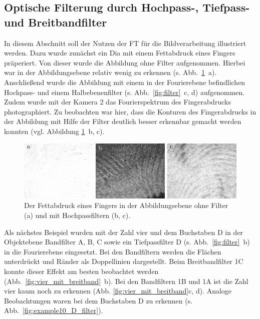 \subsection{Optische Filterung durch Hochpass-, Tiefpass- und Breitbandfilter}

In diesem Abschnitt soll der Nutzen der FT für die Bildverarbeitung illustriert werden. Dazu wurde zunächst ein Dia mit einem Fettabdruck eines Fingers präperiert. Von dieser wurde die Abbildung ohne Filter aufgenommen. Hierbei war in der Abbildungsebene relativ wenig zu erkennen (s. Abb.~\ref{fig:example20_Hochpass}~a). Anschließend wurde die Abbildung mit einem in der Fourierebene befindlichen Hochpass- und einem Halbebenenfilter (s. Abb.~\ref{fig:filter}~c, d) aufgenommen. Zudem wurde mit der Kamera 2 das Fourierspektrum des Fingerabdrucks photographiert. Zu beobachten war hier, dass die Konturen des Fingerabdrucks in der Abbildung mit Hilfe der Filter deutlich besser erkennbar gemacht werden konnten (vgl. Abbildung \ref{fig:example20_Hochpass}~b, c).

\begin{figure}[h]
	\centering
	\includegraphics{images/ergebniss_Fingerab/abb.pdf}
	\caption{
		Der Fettabdruck eines Fingers in der Abbildungsebene ohne Filter (a) und mit Hochpassfiltern (b, c).
	}
	\label{fig:example20_Hochpass}
\end{figure}

Als nächstes Beispiel wurden mit der Zahl vier und dem Buchstaben D in der Objektebene Bandfilter A, B, C  sowie ein Tiefpassfilter D (s. Abb.~\ref{fig:filter}~b) in die Fourierebene eingesetzt. Bei den Bandfiltern werden die Flächen unterdrückt und Ränder als Doppellinien dargestellt. Beim Breitbandfilter 1C konnte dieser Effekt am besten beobachtet werden (Abb.~\ref{fig:vier_mit_breitband}~b). Bei den Bandfiltern 1B und 1A ist die Zahl vier kaum noch zu erkennen (Abb. \ref{fig:vier_mit_breitband}c, d). Analoge Beobachtungen waren bei dem Buchstaben D zu erkennen (s. Abb.~\ref{fig:example10_D_filter}).

